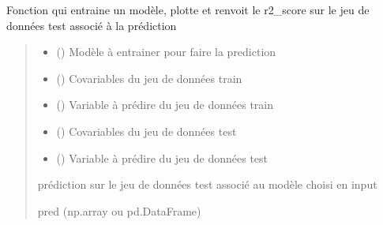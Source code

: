 \documentclass[letterpaper,10pt,french]{sphinxmanual}
\begin{document}
\begin{fulllineitems}
\label{\detokenize{general:general.train_eval}}
\pysigstartsignatures
{}
\pysigstopsignatures
\sphinxAtStartPar
Fonction qui entraine un modèle, plotte et renvoit le r2\_score sur le jeu de données test associé à la prédiction
\begin{quote}\begin{description}
\begin{itemize}
\item {} 
\sphinxAtStartPar
{} () \textendash{} Modèle à entrainer pour faire la prediction

\item {} 
\sphinxAtStartPar
{} () \textendash{} Co\sphinxhyphen{}variables du jeu de données train

\item {} 
\sphinxAtStartPar
{} () \textendash{} Variable à prédire du jeu de données train

\item {} 
\sphinxAtStartPar
{} () \textendash{} Co\sphinxhyphen{}variables du jeu de données test

\item {} 
\sphinxAtStartPar
{} () \textendash{} Variable à prédire du jeu de données test

\end{itemize}

\sphinxAtStartPar
prédiction sur le jeu de données test associé au modèle choisi en input

\sphinxAtStartPar
pred (np.array ou pd.DataFrame)

\end{description}\end{quote}

\end{fulllineitems}
\end{document}
